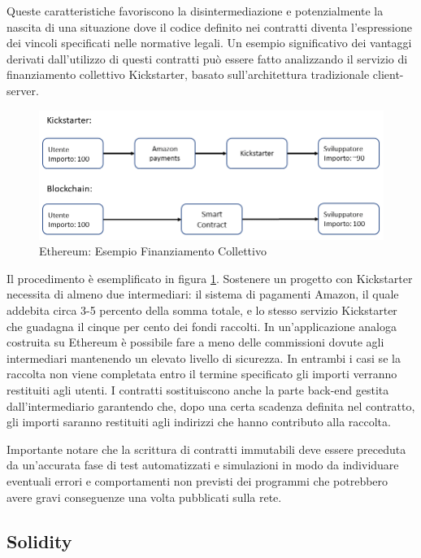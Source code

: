 Queste caratteristiche favoriscono la disintermediazione e potenzialmente la nascita di una situazione dove il codice definito nei contratti diventa l’espressione dei vincoli specificati nelle normative legali. Un esempio significativo dei vantaggi derivati dall'utilizzo di questi contratti può essere fatto analizzando il servizio  di finanziamento collettivo Kickstarter, basato sull'architettura tradizionale client-server.
\\
\begin{figure}[H]
\centering
\includegraphics[width=1\textwidth]{immagini/kickstarter.png}
\caption{Ethereum: Esempio Finanziamento Collettivo}
\label{fig:Kickstarter}
\end{figure}

Il procedimento è esemplificato in figura \ref{fig:Kickstarter}. Sostenere un progetto con Kickstarter necessita di almeno due intermediari: il sistema di pagamenti Amazon, il quale addebita circa 3-5 percento della somma totale, e lo stesso servizio Kickstarter che guadagna il cinque per cento dei fondi raccolti. In un'applicazione analoga costruita su Ethereum è possibile fare a meno delle commissioni dovute agli intermediari mantenendo un elevato livello di sicurezza. In entrambi i casi se la raccolta non viene completata entro il termine specificato gli importi verranno restituiti agli utenti. I contratti sostituiscono anche la parte back-end gestita dall'intermediario garantendo che, dopo una certa scadenza definita nel contratto, gli importi saranno restituiti agli indirizzi che hanno contributo alla raccolta. 

Importante notare che la scrittura di contratti immutabili deve essere preceduta da un’accurata fase di test automatizzati e simulazioni in modo da individuare eventuali errori e comportamenti non previsti dei programmi che potrebbero avere gravi conseguenze una volta pubblicati sulla rete.

\subsection{Solidity}

